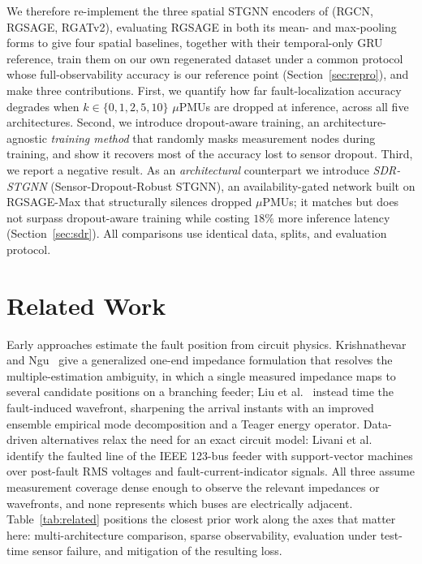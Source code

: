 \documentclass[3p,times,procedia]{elsarticle}
\begin{document}
We therefore re-implement the three spatial STGNN encoders of \cite{Karabulut2026} (RGCN, RGSAGE, RGATv2), evaluating RGSAGE in both its mean- and max-pooling forms to give four spatial baselines, together with their temporal-only GRU reference, train them on our own regenerated dataset under a common protocol whose full-observability accuracy is our reference point (Section~\ref{sec:repro}), and make three contributions. First, we quantify how far fault-localization accuracy degrades when $k \in \{0, 1, 2, 5, 10\}$ $\mu$PMUs are dropped at inference, across all five architectures. Second, we introduce dropout-aware training, an architecture-agnostic \emph{training method} that randomly masks measurement nodes during training, and show it recovers most of the accuracy lost to sensor dropout. Third, we report a negative result. As an \emph{architectural} counterpart we introduce \emph{SDR-STGNN} (Sensor-Dropout-Robust STGNN), an availability-gated network built on RGSAGE-Max that structurally silences dropped $\mu$PMUs; it matches but does not surpass dropout-aware training while costing $18\%$ more inference latency (Section~\ref{sec:sdr}). All comparisons use identical data, splits, and evaluation protocol.


\section{Related Work}
\label{sec:related}

Early approaches estimate the fault position from circuit physics. Krishnathevar and Ngu~\cite{krishnathevar2012} give a generalized one-end impedance formulation that resolves the multiple-estimation ambiguity, in which a single measured impedance maps to several candidate positions on a branching feeder; Liu et al.~\cite{liu2023} instead time the fault-induced wavefront, sharpening the arrival instants with an improved ensemble empirical mode decomposition and a Teager energy operator. Data-driven alternatives relax the need for an exact circuit model: Livani et al.~\cite{livani2013} identify the faulted line of the IEEE 123-bus feeder with support-vector machines over post-fault RMS voltages and fault-current-indicator signals. All three assume measurement coverage dense enough to observe the relevant impedances or wavefronts, and none represents which buses are electrically adjacent. Table~\ref{tab:related} positions the closest prior work along the axes that matter here: multi-architecture comparison, sparse observability, evaluation under test-time sensor failure, and mitigation of the resulting loss.
\end{document}
